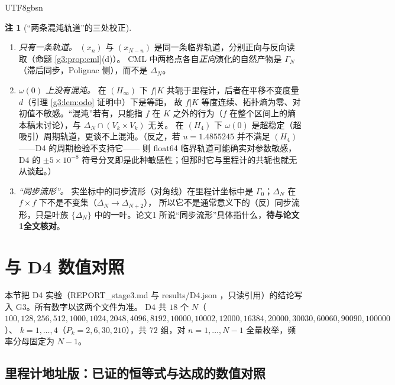 \documentclass[11pt,a4paper]{article}
\theoremstyle{plain}
\theoremstyle{definition}
\newtheorem{rem}[lem]{注}
\begin{document}
\begin{CJK}{UTF8}{gbsn}
\begin{rem}[“两条混沌轨道”的三处校正]\label{g3:rem:entropy}
\begin{enumerate}[leftmargin=*,label=(\arabic*)]
\item \emph{只有一条轨道。} $(x_n)$ 与 $(x_{N-n})$ 是同一条临界轨道，分别正向与反向读取（命题 \ref{g3:prop:cml}(d)）。
CML 中两格点各自\emph{正向}演化的自然产物是 $\Gamma_N$（滞后同步，Polignac 侧），而不是 $\Delta_N$。
\item \emph{$\omega(0)$ 上没有混沌。} 在 $(H_\infty)$ 下 $f|K$ 共轭于里程计，后者在平移不变度量 $d$（引理 \ref{g3:lem:odo} 证明中）下是等距，
故 $f|K$ 等度连续、拓扑熵为零、对初值不敏感。“混沌”若有，只能指 $f$ 在 $K$ 之外的行为（$f$ 在整个区间上的熵本稿未讨论），与 $\Delta_N\cap(V_k\times V_k)$ 无关。
在 $(H_4)$ 下 $\omega(0)$ 是超稳定（超吸引）周期轨道，更谈不上混沌。（反之，若 $u=1.4855245$ 并不满足 $(H_4)$——D4 的周期检验不支持它——
则 float64 临界轨道可能确实对参数敏感，D4 的 $\pm5\times10^{-8}$ 符号分叉即是此种敏感性；但那时它与里程计的共轭也就无从谈起。）
\item \emph{“同步流形”。} 实坐标中的同步流形（对角线）在里程计坐标中是 $\Gamma_0$；$\Delta_N$ 在 $f\times f$ 下不是不变集（$\Delta_N\to\Delta_{N+2}$），
所以它不是通常意义下的（反）同步流形，只是叶族 $\{\Delta_N\}$ 中的一叶。论文1 所说“同步流形”具体指什么，\textbf{待与论文1全文核对}。
\end{enumerate}
\end{rem}

\section{与 D4 数值对照}\label{g3:sec:d4}

本节把 D4 实验（REPORT\_stage3.md 与 results/D4.json \cite{D4}，只读引用）的结论写入 G3。所有数字以这两个文件为准。
D4 共 $18$ 个 $N$（$100,128,256,512,1000,1024,2048,4096,8192,10000,10002,12000,16384,20000,30030,60060,90090,100000$）、
$k=1,\dots,4$（$P_k=2,6,30,210$），共 $72$ 组，对 $n=1,\dots,N-1$ 全量枚举，频率分母固定为 $N-1$。

\subsection{里程计地址版：已证的恒等式与达成的数值对照}


\end{CJK}
\end{document}
